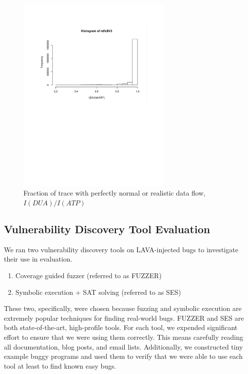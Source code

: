 \begin{figure}
\centering
\includegraphics[width=3in]{rdf.pdf}
\caption{Fraction of trace with perfectly normal or realistic data flow, $I(DUA)/I(ATP)$}
\label{fig:rdf-hist}
\end{figure}




\subsection{Vulnerability Discovery Tool Evaluation}

We ran two vulnerability discovery tools on LAVA-injected bugs to investigate their use in evaluation.

\begin{enumerate}
\item Coverage guided fuzzer (referred to as FUZZER)
\item Symbolic execution + SAT solving (referred to as SES)
\end{enumerate}

These two, specifically, were chosen because fuzzing and symbolic execution are extremely popular techniques for finding real-world bugs.
FUZZER and SES are both state-of-the-art, high-profile tools. 
For each tool, we expended significant effort to ensure that we were using them correctly.
This means carefully reading all documentation, blog posts, and email lists.
Additionally, we constructed tiny example buggy programs and used them to verify that we were able to use each tool at least to find known easy bugs.  

